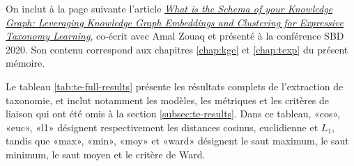 



On inclut à la page suivante l'article \href{https://dl.acm.org/doi/10.1145/3391274.3393637}{\textit{What is the Schema of your Knowledge Graph: Leveraging Knowledge Graph Embeddings and Clustering for Expressive Taxonomy Learning}}, co-écrit avec Amal Zouaq et présenté à la conférence SBD 2020. Son contenu correspond aux chapitres \ref{chap:kge} et \ref{chap:texp} du présent mémoire.




\label{ann:results}
Le tableau \ref{tab:te-full-results} présente les résultats complets de l'extraction de taxonomie, et inclut notamment les modèles, les métriques et les critères de liaison qui ont été omis à la section \ref{subsec:te-results}. Dans ce tableau, «cos», «euc», «l1» désignent respectivement les distances cosinus, euclidienne et $L_1$, tandis que «max», «min», «moy» et «ward» désignent le saut maximum, le saut minimum, le saut moyen et le critère de Ward.



